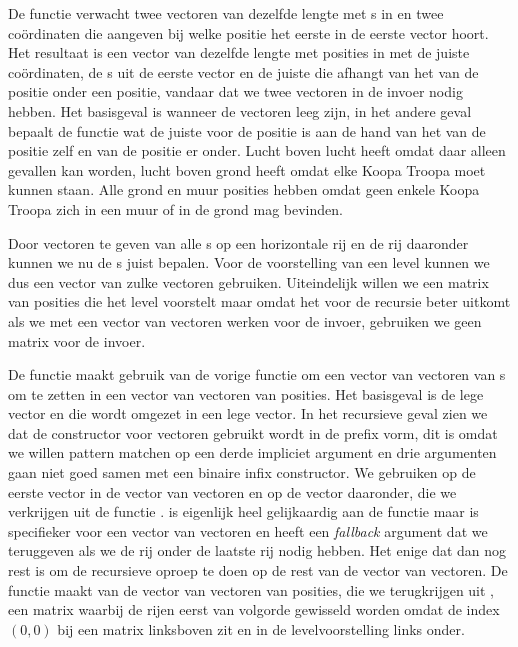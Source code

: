 De  functie verwacht twee vectoren van dezelfde lengte
met s in en twee coördinaten die aangeven bij welke positie het
eerste  in de eerste vector hoort. Het resultaat is een vector
van dezelfde lengte met posities in met de juiste coördinaten, de
s uit de eerste vector en de juiste  die
afhangt van het  van de positie onder een positie, vandaar dat
we twee vectoren in de invoer nodig hebben. Het basisgeval is wanneer de
vectoren leeg zijn, in het andere geval bepaalt de functie 
wat de juiste  voor de positie is aan de hand van het
 van de positie zelf en van de positie er onder. Lucht boven
lucht heeft   omdat daar alleen gevallen kan
worden, lucht boven grond heeft   omdat elke Koopa
Troopa moet kunnen staan. Alle grond en muur posities hebben 
 omdat geen enkele Koopa Troopa zich in een muur of in de grond
mag bevinden.

Door vectoren te geven van alle s op een horizontale rij en de
rij daaronder kunnen we nu de s juist bepalen. Voor de
voorstelling van een level kunnen we dus een vector van zulke vectoren
gebruiken. Uiteindelijk willen we een matrix van posities die het level
voorstelt maar omdat het voor de recursie beter uitkomt als we met een vector
van vectoren werken voor de invoer, gebruiken we geen matrix voor de invoer.


De functie  maakt gebruik van de vorige functie om een
vector van vectoren van s om te zetten in een vector van
vectoren van posities. Het basisgeval is de lege vector en die wordt omgezet in
een lege vector. In het recursieve geval zien we dat de  constructor
voor vectoren gebruikt wordt in de prefix vorm, dit is omdat we willen pattern
matchen op een derde impliciet argument en drie argumenten gaan niet goed samen
met een binaire infix constructor. We gebruiken  op de
eerste vector in de vector van vectoren en op de vector daaronder, die we
verkrijgen uit de functie .  is eigenlijk heel
gelijkaardig aan de  functie maar is specifieker voor een vector
van vectoren en heeft een \emph{fallback} argument dat we teruggeven als we de
rij onder de laatste rij nodig hebben. Het enige dat dan nog rest is om de
recursieve oproep te doen op de rest van de vector van vectoren. De
 functie maakt van de vector van vectoren van posities, die we
terugkrijgen uit , een matrix waarbij de rijen eerst van
volgorde gewisseld worden omdat de index $(0,0)$ bij een matrix linksboven zit
en in de levelvoorstelling links onder.

